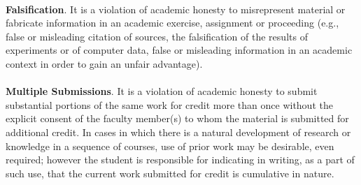 \documentclass{article}
\begin{document}
\\
\textbf{Falsiﬁcation}. It is a violation of academic honesty to misrepresent material or fabricate information in an academic exercise, assignment or proceeding (e.g., false or misleading citation of sources, the falsiﬁcation of the results of experiments or of computer data, false or misleading information in an academic context in order to gain an unfair advantage).\\
\\
\textbf{Multiple Submissions}. It is a violation of academic honesty to submit substantial portions of the same work for credit more than once without the explicit consent of the faculty member(s) to whom the material is submitted for additional credit. In cases in which there is a natural development of research or knowledge in a sequence of courses, use of prior work may be desirable, even required; however the student is responsible for indicating in writing, as a part of such use, that the current work submitted for credit is cumulative in nature.
\end{document}
